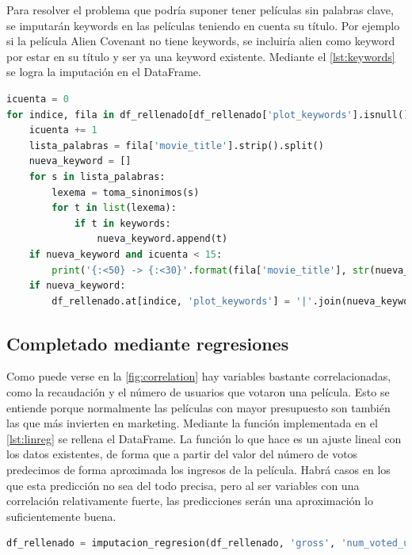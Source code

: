 Para resolver el problema que podría suponer tener películas sin palabras clave, se imputarán keywords en las películas teniendo en cuenta su título. Por ejemplo si la película Alien Covenant no tiene keywords, se incluiría alien como keyword por estar en su título y ser ya una keyword existente. Mediante el \autoref{lst:keywords} se logra la imputación en el DataFrame.

\begin{lstlisting}[language=Python, caption={Imputación de keywords a partir del título de la película. Cuando una película no tiene keywords se utiliza su título como fuente de keywords, tomando del mismo las palabras que ya sean keywords de otra película.}, label ={lst:keywords}]
icuenta = 0
for indice, fila in df_rellenado[df_rellenado['plot_keywords'].isnull()].iterrows():
    icuenta += 1
    lista_palabras = fila['movie_title'].strip().split()
    nueva_keyword = []
    for s in lista_palabras:
        lexema = toma_sinonimos(s)
        for t in list(lexema):
            if t in keywords: 
                nueva_keyword.append(t)                
    if nueva_keyword and icuenta < 15: 
        print('{:<50} -> {:<30}'.format(fila['movie_title'], str(nueva_keyword)))
    if nueva_keyword:
        df_rellenado.at[indice, 'plot_keywords'] = '|'.join(nueva_keyword)
\end{lstlisting}

\subsection{Completado mediante regresiones}

Como puede verse en la \autoref{fig:correlation} hay variables bastante correlacionadas, como la recaudación y el número de usuarios que votaron una película. Esto se entiende porque normalmente las películas con mayor presupuesto son también las que más invierten en marketing. Mediante la función implementada en el \autoref{lst:linreg} se rellena el DataFrame. La función lo que hace es un ajuste lineal con los datos existentes, de forma que a partir del valor del número de votos predecimos de forma aproximada los ingresos de la película. Habrá casos en los que esta predicción no sea del todo precisa, pero al ser variables con una correlación relativamente fuerte, las predicciones serán una aproximación lo suficientemente buena.

\begin{lstlisting}[language=Python, caption = {Rellenado de la variable de ingresos teniendo en cuenta el número de votos. Para ello, se utiliza la función definida en el \autoref{lst:linreg}.}]
df_rellenado = imputacion_regresion(df_rellenado, 'gross', 'num_voted_users')
\end{lstlisting}

